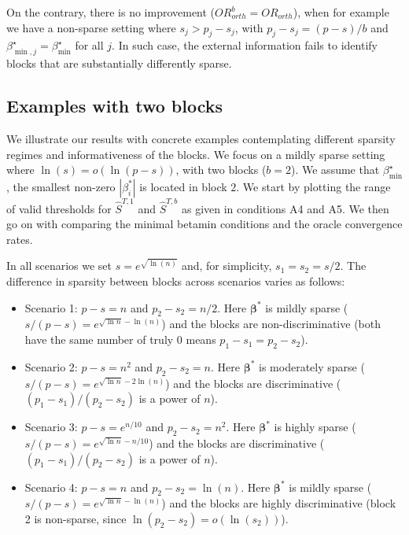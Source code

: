 \documentclass[aos]{imsart}
\theoremstyle{plain}
\newcommand{\bs}{\boldsymbol}
\begin{document}
On the contrary, there is no improvement 
(${OR}^b_{orth}={OR}_{orth}$), 
when for example 
we have a non-sparse setting where $s_j>p_j-s_j$, with
$p_j-s_j=(p-s)/b$ and $\beta^\star_{\min,j}=\beta_{\min}^\star$ for all $j$. In such case, the external information fails to identify blocks that are substantially differently sparse. 

\subsection{Examples with two blocks}\label{sec:examples}

We illustrate our results with concrete examples contemplating different sparsity regimes and informativeness of the blocks. 
We focus on a mildly sparse setting where $\ln(s)=o(\ln(p-s))$, with two blocks ($b=2$). We assume that $\beta_{\min}^{\star}$, the smallest non-zero $|\beta_i^*|$ %
is located in block $2$. We start by plotting the range of valid thresholds for $\hat{S}^{T,1}$ and $\hat{S}^{T,b}$ as given in conditions A4 and A5. We then go on with comparing the minimal betamin conditions and the %
oracle convergence rates.

In all scenarios we set $s=e^{\sqrt{\ln(n)}}$ and, for simplicity, $s_1=s_2=s/2$. The difference in sparsity between blocks %
across scenarios varies as follows:
\begin{itemize}
    \item Scenario 1: $p-s=n$ and $p_2-s_2=n/2$. Here $\bs\beta^*$ is mildly sparse ($s/(p-s)= e^{\sqrt{\ln n} - \ln(n)}$) and the blocks are non-discriminative (both have the same number of truly 0 means $p_1-s_1=p_2-s_2$). %
    \item Scenario 2: $p-s=n^2$ and $p_2-s_2=n$. Here $\bs\beta^*$ is moderately sparse ($s/(p-s)= e^{\sqrt{\ln n} - 2\ln(n)}$) and the blocks are %
    discriminative ($(p_1-s_1)/(p_2-s_2)$ is a power of $n$). %
    \item Scenario 3: $p-s=e^{n/10}$ and $p_2-s_2=n^2$. Here $\bs\beta^*$ is highly sparse ($s/(p-s)= e^{\sqrt{\ln n} - n/10}$) and the blocks are %
    discriminative ($(p_1-s_1)/(p_2-s_2)$ is a power of $n$). %
    \item Scenario 4: $p-s=n$ and $p_2-s_2=\ln(n)$. Here $\bs\beta^*$ is mildly sparse ($s/(p-s)= e^{\sqrt{\ln n} - \ln(n)}$) and the blocks are %
    highly discriminative (block 2 is non-sparse, since $\ln(p_2-s_2)=o(\ln(s_2))$).
\end{itemize}
\end{document}
